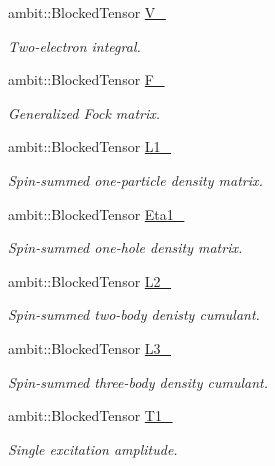 \begin{DoxyCompactItemize}
ambit\+::\+Blocked\+Tensor \mbox{\hyperlink{classforte_1_1_d_s_r_g___m_r_p_t_a26b8cb138fc31e37ed21ef9c5e63064a}{V\+\_\+}}
\begin{DoxyCompactList}\small\item\em Two-\/electron integral. \end{DoxyCompactList}\item 
ambit\+::\+Blocked\+Tensor \mbox{\hyperlink{classforte_1_1_d_s_r_g___m_r_p_t_aefef1b1d0c0b2d689a33f1358b7555c4}{F\+\_\+}}
\begin{DoxyCompactList}\small\item\em Generalized Fock matrix. \end{DoxyCompactList}\item 
ambit\+::\+Blocked\+Tensor \mbox{\hyperlink{classforte_1_1_d_s_r_g___m_r_p_t_a3561791b83c0bee4ad6c0739d6ab1ee6}{L1\+\_\+}}
\begin{DoxyCompactList}\small\item\em Spin-\/summed one-\/particle density matrix. \end{DoxyCompactList}\item 
ambit\+::\+Blocked\+Tensor \mbox{\hyperlink{classforte_1_1_d_s_r_g___m_r_p_t_aef85158de6f4244805554d74b49aad23}{Eta1\+\_\+}}
\begin{DoxyCompactList}\small\item\em Spin-\/summed one-\/hole density matrix. \end{DoxyCompactList}\item 
ambit\+::\+Blocked\+Tensor \mbox{\hyperlink{classforte_1_1_d_s_r_g___m_r_p_t_a3346b53af8194e80373ce4f85b50c245}{L2\+\_\+}}
\begin{DoxyCompactList}\small\item\em Spin-\/summed two-\/body denisty cumulant. \end{DoxyCompactList}\item 
ambit\+::\+Blocked\+Tensor \mbox{\hyperlink{classforte_1_1_d_s_r_g___m_r_p_t_a0e9b4e7b2058cd17615dd7b6aad54794}{L3\+\_\+}}
\begin{DoxyCompactList}\small\item\em Spin-\/summed three-\/body density cumulant. \end{DoxyCompactList}\item 
ambit\+::\+Blocked\+Tensor \mbox{\hyperlink{classforte_1_1_d_s_r_g___m_r_p_t_a952a44d9fc97bab37f8491d975e5474b}{T1\+\_\+}}
\begin{DoxyCompactList}\small\item\em Single excitation amplitude. \end{DoxyCompactList}\item 

\end{DoxyCompactItemize}
